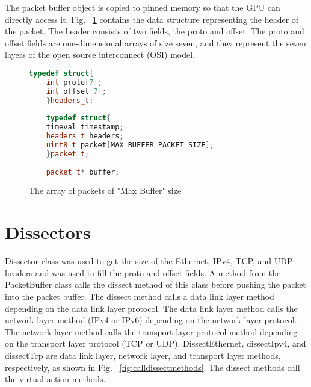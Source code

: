 The packet buffer object is copied to pinned memory so that the GPU can directly access it. Fig. ~\ref{fig:packetbuffer} contains the data structure representing the header of the packet. The header consists of two fields, the proto and offset. The proto and offset fields are one-dimensional arrays of size seven, and they represent the seven layers of the open source interconnect (OSI) model.

\begin{figure}[H]
	\centering
	\begin{lstlisting}[frame=none,language=C++] 
	typedef struct{
	int proto[7];
	int offset[7];        
	}headers_t;
	
	typedef struct{
	timeval timestamp;
	headers_t headers;
	uint8_t packet[MAX_BUFFER_PACKET_SIZE];
	}packet_t;
	
	packet_t* buffer;
	\end{lstlisting}
	\caption[The array of packets of "Max Buffer" size]{The array of packets of "Max Buffer" size}
	\label{fig:packetbuffer}
\end{figure}
\squeezeup
\section{Dissectors}
Dissector class was used to get the size of the Ethernet, IPv4, TCP, and UDP headers and was used to fill the proto and offset fields. A method from the PacketBuffer class calls the dissect method of this class before pushing the packet into the packet buffer. The dissect method calls a data link layer method depending on the data link layer protocol. The data link layer method calls the network layer method (IPv4 or IPv6) depending on the network layer protocol. The network layer method calls the transport layer protocol method depending on the transport layer protocol (TCP or UDP). DissectEthernet, dissectIpv4, and dissectTcp are data link layer, network layer, and transport layer methods, respectively, as shown in Fig. ~\ref{fig:calldissectmethods}. The dissect methods call the virtual action methods.

